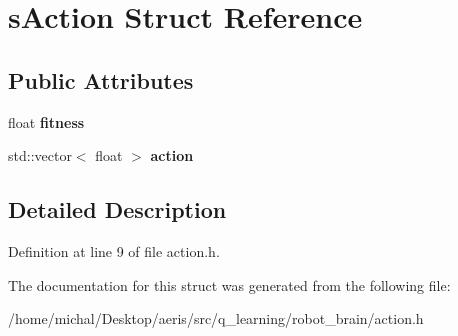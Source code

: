 \hypertarget{structsAction}{\section{s\-Action Struct Reference}
\label{structsAction}
}
\subsection*{Public Attributes}
\begin{DoxyCompactItemize}
\item 
\hypertarget{structsAction_ab3037a9305dfc2c94d804c053a88bf9c}{float {\bfseries fitness}}\label{structsAction_ab3037a9305dfc2c94d804c053a88bf9c}

\item 
\hypertarget{structsAction_a04bcaa29a01f8fc26b6906ac3f584029}{std\-::vector$<$ float $>$ {\bfseries action}}\label{structsAction_a04bcaa29a01f8fc26b6906ac3f584029}

\end{DoxyCompactItemize}


\subsection{Detailed Description}


Definition at line 9 of file action.\-h.



The documentation for this struct was generated from the following file\-:\begin{DoxyCompactItemize}
\item 
/home/michal/\-Desktop/aeris/src/q\-\_\-learning/robot\-\_\-brain/action.\-h\end{DoxyCompactItemize}
